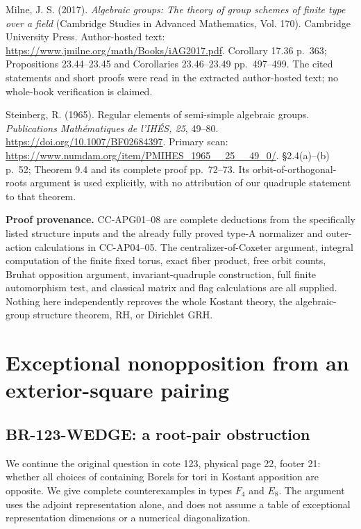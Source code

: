 \documentclass[11pt,a4paper]{article}
\theoremstyle{definition}\newtheorem{definition}[theorem]{Definition}
\theoremstyle{remark}\newtheorem{remark}[theorem]{Remark}
\begin{document}
Milne, J. S. (2017). \emph{Algebraic groups: The theory of group schemes
of finite type over a field} (Cambridge Studies in Advanced Mathematics,
Vol. 170). Cambridge University Press. Author-hosted text:
\url{https://www.jmilne.org/math/Books/iAG2017.pdf}. Corollary 17.36 p.~363;
Propositions 23.44--23.45 and Corollaries 23.46--23.49 pp.~497--499. The
cited statements and short proofs were read in the extracted
author-hosted text; no whole-book verification is claimed.

Steinberg, R. (1965). Regular elements of semi-simple algebraic groups.
\emph{Publications Mathématiques de l'IHÉS, 25}, 49--80.
\url{https://doi.org/10.1007/BF02684397}. Primary scan:
\url{https://www.numdam.org/item/PMIHES\_1965\_\_25\_\_49\_0/}. §2.4(a)--(b)
p.~52; Theorem 9.4 and its complete proof pp.~72--73. Its
orbit-of-orthogonal-roots argument is used explicitly, with no
attribution of our quadruple statement to that theorem.

\textbf{Proof provenance.} CC-APG01--08 are complete deductions from the
specifically listed structure inputs and the already fully proved type-A
normalizer and outer-action calculations in CC-AP04--05. The
centralizer-of-Coxeter argument, integral computation of the finite
fixed torus, exact fiber product, free orbit counts, Bruhat opposition
argument, invariant-quadruple construction, full finite automorphism
test, and classical matrix and flag calculations are all supplied.
Nothing here independently reproves the whole Kostant theory, the
algebraic-group structure theorem, RH, or Dirichlet GRH.


\section{Exceptional nonopposition from an exterior-square pairing}

\subsection{BR-123-WEDGE: a root-pair obstruction}
We continue the original question in cote 123, physical page 22,
footer 21: whether all choices of containing Borels for tori in
Kostant apposition are opposite.  We give complete counterexamples
in types $F_4$ and $E_8$.  The argument uses the adjoint representation
alone, and does not assume a table of exceptional representation
dimensions or a numerical diagonalization.
\end{document}
